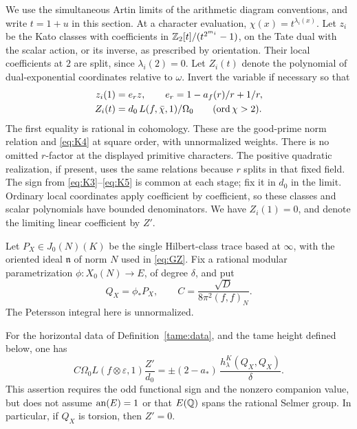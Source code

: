 We use the simultaneous Artin limits of the arithmetic diagram
conventions, and write \(t=1+u\) in this section. At a character evaluation,
\(\chi(x)=t^{\lambda_i(x)}\). Let \(z_i\) be the Kato classes with
coefficients in \(\mathbb Z_2[t]/(t^{2^{m_i}}-1)\), on the Tate dual with the
scalar action, or its inverse, as prescribed by orientation. Their
local coefficients at \(2\) are split, since \(\lambda_i(2)=0\).
Let \(Z_i(t)\) denote the polynomial of dual-exponential coordinates
relative to \(\omega\). Invert the variable if necessary so that
\begin{equation}\label{tame:reciprocity}
 \begin{split}
 z_i(1)&=e_rz,\qquad e_r=1-a_f(r)/r+1/r,\\
 Z_i(t)&=d_0\,L(f,\bar\chi,1)/\Omega_0
       \qquad(\operatorname{ord}\chi>2).
 \end{split}
\end{equation}
The first equality is rational in cohomology. These are the good-prime
norm relation and \eqref{eq:K4} at square order, with unnormalized weights.
There is no omitted \(r\)-factor at the displayed primitive characters.
The positive quadratic realization, if present, uses the same relations
because \(r\) splits in that fixed field. The sign from
\eqref{eq:K3}--\eqref{eq:K5} is common at each stage; fix it in \(d_0\)
in the limit. Ordinary local coordinates apply coefficient by coefficient,
so these classes and scalar polynomials have bounded denominators.
We have \(Z_i(1)=0\), and denote the limiting linear coefficient by \(Z'\).

Let \(P_X\in J_0(N)(K)\) be the single Hilbert-class trace based at
\(\infty\), with the oriented ideal \(\mathfrak n\) of norm \(N\) used in
\eqref{eq:GZ}. Fix a rational modular parametrization
\(\phi:X_0(N)\to E\), of degree \(\delta\), and put
\[
 Q_X=\phi_*P_X,\qquad
 C=\frac{\sqrt D}{8\pi^2(f,f)_N}.
\]
The Petersson integral here is unnormalized.

\begin{proposition}\label{tame:spectral}
For the horizontal data of Definition~\ref{tame:data}, and the tame
height defined below, one has
\begin{equation}\label{tame:spectral-identity}
 C\Omega_0L(f\otimes\varepsilon,1)\frac{Z'}{d_0}
   =\pm(2-a_*)\,\frac{h_\lambda^K(Q_X,Q_X)}{\delta}.
\end{equation}
This assertion requires the odd functional sign and the nonzero
companion value, but does not assume \(\operatorname{an}(E)=1\) or that \(E(\mathbb Q)\)
spans the rational Selmer group. In particular, if \(Q_X\) is torsion,
then \(Z'=0\).
\end{proposition}

